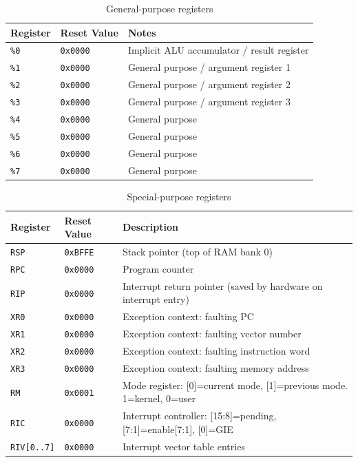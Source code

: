 \documentclass[a4paper,12pt]{report}
\newcommand{\asm}[1]{\texttt{#1}}
\newcommand{\reg}[1]{\texttt{\%#1}}
\begin{document}
\begin{table}[htbp]
\centering
\caption{General-purpose registers}
\begin{tabularx}{\textwidth}{llX}
\toprule
\textbf{Register} & \textbf{Reset Value} & \textbf{Notes} \\
\midrule
\reg{0} & \texttt{0x0000} & Implicit ALU accumulator / result register \\
\reg{1} & \texttt{0x0000} & General purpose / argument register 1 \\
\reg{2} & \texttt{0x0000} & General purpose / argument register 2 \\
\reg{3} & \texttt{0x0000} & General purpose / argument register 3 \\
\reg{4} & \texttt{0x0000} & General purpose \\
\reg{5} & \texttt{0x0000} & General purpose \\
\reg{6} & \texttt{0x0000} & General purpose \\
\reg{7} & \texttt{0x0000} & General purpose \\
\bottomrule
\end{tabularx}
\end{table}

\begin{table}[htbp]
\centering
\caption{Special-purpose registers}
\begin{tabularx}{\textwidth}{llX}
\toprule
\textbf{Register} & \textbf{Reset Value} & \textbf{Description} \\
\midrule
\asm{RSP}  & \texttt{0xBFFE} & Stack pointer (top of RAM bank 0) \\
\asm{RPC}  & \texttt{0x0000} & Program counter \\
\asm{RIP}  & \texttt{0x0000} & Interrupt return pointer (saved by hardware on interrupt entry) \\
\asm{XR0}  & \texttt{0x0000} & Exception context: faulting PC \\
\asm{XR1}  & \texttt{0x0000} & Exception context: faulting vector number \\
\asm{XR2}  & \texttt{0x0000} & Exception context: faulting instruction word \\
\asm{XR3}  & \texttt{0x0000} & Exception context: faulting memory address \\
\asm{RM}   & \texttt{0x0001} & Mode register: [0]=current mode, [1]=previous mode. 1=kernel, 0=user \\
\asm{RIC}  & \texttt{0x0000} & Interrupt controller: [15:8]=pending, [7:1]=enable[7:1], [0]=GIE \\
\asm{RIV[0..7]} & \texttt{0x0000} & Interrupt vector table entries \\
\bottomrule
\end{tabularx}
\end{table}

\printindex
\end{document}
